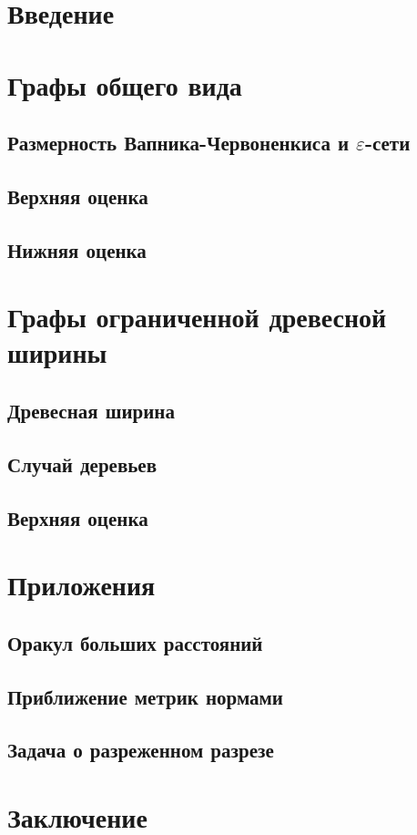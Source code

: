 \documentclass{article}
\newcommand{\eps}{\varepsilon}
\begin{document}
    \cite{A10}
    \section{Введение}
    \section{Графы общего вида}
    \subsection{Размерность Вапника-Червоненкиса и $\eps$-сети}
    \subsection{Верхняя оценка}
    \subsection{Нижняя оценка}
    \section{Графы ограниченной древесной ширины}
    \subsection{Древесная ширина}
    \subsection{Случай деревьев}
    \subsection{Верхняя оценка}
    \section{Приложения}
    \subsection{Оракул больших расстояний}
    \subsection{Приближение метрик нормами}
    \subsection{Задача о разреженном разрезе}
    \section{Заключение}
    
    
\end{document}
